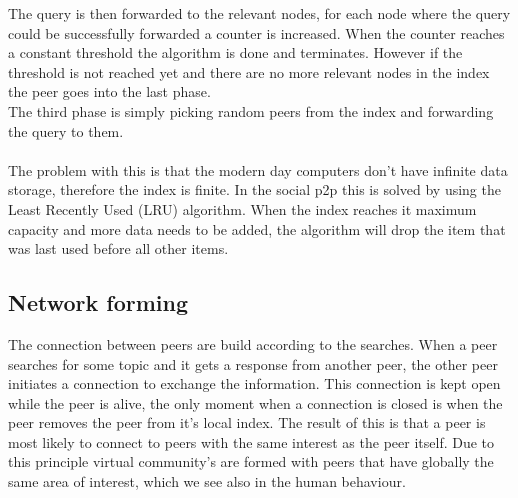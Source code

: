 		The query is then forwarded to the relevant nodes, for each node where the query could be successfully forwarded a counter is increased.
		When the counter reaches a constant threshold the algorithm is done and terminates.
		However if the threshold is not reached yet and there are no more relevant nodes in the index the peer goes into the last phase.\\
		The third phase is simply picking random peers from the index and forwarding the query to them.\\
		\\
		The problem with this is that the modern day computers don't have infinite data storage, therefore the index is finite.
		In the social p2p this is solved by using the Least Recently Used (LRU) algorithm.
		When the index reaches it maximum capacity and more data needs to be added, the algorithm will drop the item that was last used before all other items.\\
		
	\subsection{Network forming}
		The connection between peers are build according to the searches.
		When a peer searches for some topic and it gets a response from another peer, the other peer initiates a connection to exchange the information.
		This connection is kept open while the peer is alive, the only moment when a connection is closed is when the peer removes the peer from it's local index.
		The result of this is that a peer is most likely to connect to peers with the same interest as the peer itself.
		Due to this principle virtual community's are formed with peers that have globally the same area of interest, which we see also in the human behaviour.
		

{}	